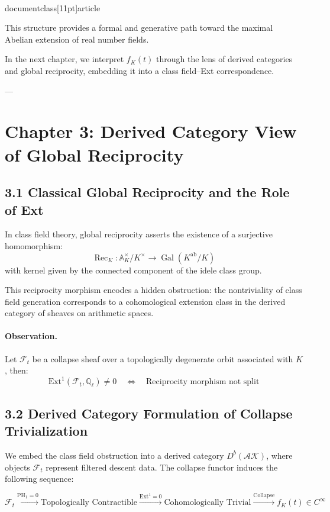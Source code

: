 \\documentclass[11pt]{article}
\begin{document}
This structure provides a formal and generative path toward the maximal Abelian extension of real number fields.

In the next chapter, we interpret \( f_K(t) \) through the lens of derived categories and global reciprocity, embedding it into a class field–Ext correspondence.


---


\section*{Chapter 3: Derived Category View of Global Reciprocity}

\subsection*{3.1 Classical Global Reciprocity and the Role of Ext}

In class field theory, global reciprocity asserts the existence of a surjective homomorphism:
\[
\operatorname{Rec}_K : \mathbb{A}_K^\times / K^\times \longrightarrow \operatorname{Gal}(K^{\mathrm{ab}} / K)
\]
with kernel given by the connected component of the idele class group.

This reciprocity morphism encodes a hidden obstruction: the nontriviality of class field generation corresponds to a cohomological extension class in the derived category of sheaves on arithmetic spaces.

\paragraph{Observation.}  
Let \( \mathcal{F}_t \) be a collapse sheaf over a topologically degenerate orbit associated with \( K \), then:
\[
\mathrm{Ext}^1(\mathcal{F}_t, \mathbb{Q}_\ell) \neq 0 \quad \Longleftrightarrow \quad \text{Reciprocity morphism not split}
\]

\subsection*{3.2 Derived Category Formulation of Collapse Trivialization}

We embed the class field obstruction into a derived category \( D^b(\mathcal{AK}) \), where objects \( \mathcal{F}_t \) represent filtered descent data. The collapse functor induces the following sequence:

\[
\mathcal{F}_t \xrightarrow{\text{PH}_1 = 0} \text{Topologically Contractible} \xrightarrow{\text{Ext}^1 = 0} \text{Cohomologically Trivial} \xrightarrow{\text{Collapse}} f_K(t) \in C^\infty
\]
\end{document}
